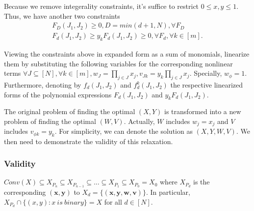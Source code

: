 \documentclass{article}
\begin{document}
Because we remove integerality constraints, it's suffice to restrict $0 \leq x,y \leq 1$. Thus, we have another two constraints
\begin{equation}
  \begin{gathered}
    \label{con2}
  F_D(J_1, J_2) \geq 0, D = min(d+1, N), \forall F_D \\
    F_d(J_1, J_2) \geq y_kF_d(J_1, J_2) \geq 0, \forall F_d, \forall k\in [m].
  \end{gathered}
\end{equation}

\begin{Define}
  Viewing the constraints above in expanded form as a sum of monomials, linearize them by substituting the following variables for the corresponding nonlinear terms $\forall J \subseteq [N],\forall k \in [m], w_J = \prod_{j \in J}x_j, v_{Jk} = y_k\prod_{j \in J}x_j.$ Specially, $w_{\phi} = 1.$ Furthermore, denoting by $f_d(J_1, J_2)$ and $f_d^k(J_1, J_2)$ the respective linearized forms of the polynomial expressions $F_d(J_1, J_2)$ and $y_kF_d(J_1, J_2)$.
\end{Define}

The original problem of finding the optimal $(X, Y)$ is transformed into a new problem of finding the optimal $(W, V)$. Actually, $W$ includes $w_j = x_j$ and $V$ includes $v_{\phi k} = y_k.$ For simplicity, we can denote the solution as $(X,Y,W,V).$ We then need to
demonstrate the validity of this relaxation.

\subsubsection{Validity}

\begin{Theorem}
  \begin{theorem}
    $Conv(X) \subseteq X_{P_n} \subseteq X_{P_{n-1}} \subseteq ... \subseteq X_{P_1} \subseteq X_{P_0} = X_{0}$ where $X_{P_d}$ is the corresponding $(\mathbf{x}, \mathbf{y})$ to $X_d = \{(\mathbf{x}, \mathbf{y}, \mathbf{w}, \mathbf{v})\}.$ In particular, $X_{P_d} \cap \{(x,y): x \ is \ binary\} = X$ for all $d \in [N].$
  \end{theorem}
\end{Theorem}
\end{document}
